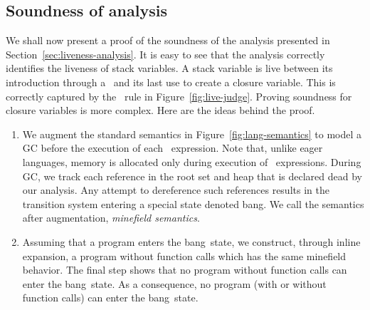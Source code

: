 \documentclass[9pt,nonatbib]{sigplanconf}
\newcommand{\added}[1]{{\color{Myblue}{#1}}}
\newcommand{\bang}{\mbox{\sc bang}}
\begin{document}
\subsection{Soundness of analysis}  

We shall now present a proof of the soundness of the analysis presented in
Section~\ref{sec:liveness-analysis}. It is easy to see that the analysis
correctly identifies the liveness of stack variables. A stack variable
is live
between its introduction through a \LET\  and its last use to
create a closure variable. This is correctly captured by the
\LET\ rule in Figure~\ref{fig:live-judge}.
Proving soundness  for closure  variables is more complex. Here  are the
ideas behind the proof. 
\begin{enumerate}
\item      We     augment      the      standard     semantics      in
  Figure~\ref{fig:lang-semantics} to  model a GC before  the execution
  of  each \LET\  expression. Note  that, unlike  eager
    languages,   memory  is   allocated  only   during  execution   of
    \LET\ expressions. During GC, we track each reference in the root
  set and heap that is declared  dead by our analysis.  Any attempt to
  dereference  such  references  results   in  the  transition  system
  entering a special state denoted \bang.  We call the semantics after
  augmentation, \emph{minefield semantics}.

\item \label{inline1} Assuming that a program enters the \bang\ state,
  we  construct,  through  inline expansion,  a  program
  without function  calls which has  the same minefield  behavior. The
  final step shows that no program  without function calls can enter the
  \bang\ state. As a consequence,  no program (with or without function
  calls) can enter the \bang\ state.
\end{enumerate}
\end{document}
